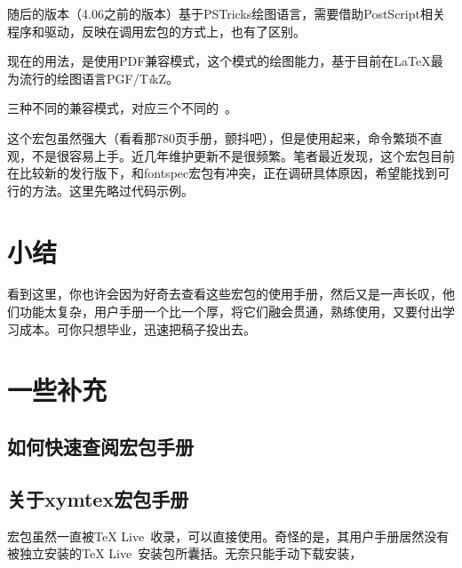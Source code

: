 \documentclass[a4paper,UTF8,zihao = -4]{ctexart} %
\providecommand{\tikzlg}{PGF/T\textit{i}kZ}
\begin{document}
随后的版本（4.06之前的版本）基于PSTricks绘图语言，需要借助PostScript相关程序和驱动，反映在调用宏包的方式上，也有了区别。

\begin{dispListing}
\usepackage{xymtexps} %
\end{dispListing}

现在的用法，是使用PDF兼容模式，这个模式的绘图能力，基于目前在\LaTeX{}最为流行的绘图语言\tikzlg{}。

\begin{dispListing}
\end{dispListing}

三种不同的兼容模式，对应三个不同的~。

这个宏包虽然强大（看看那780页手册，颤抖吧），但是使用起来，命令繁琐不直观，不是很容易上手。近几年维护更新不是很频繁。笔者最近发现，这个宏包目前在比较新的发行版下，和\textsf{fontspec}宏包有冲突，正在调研具体原因，希望能找到可行的方法。这里先略过代码示例。


\section*{小结}
\label{sec:conclusion}

看到这里，你也许会因为好奇去查看这些宏包的使用手册，然后又是一声长叹，他们功能太复杂，用户手册一个比一个厚，将它们融会贯通，熟练使用，又要付出学习成本。可你只想毕业，迅速把稿子投出去。

\section*{一些补充}
\label{sec:miscellaneous}


\subsection*{如何快速查阅宏包手册}
\label{sec:texdoc}



\subsection*{关于\textsf{xymtex}宏包手册} %
\label{sec:xymtexDoc}
\XyMTeX{}宏包虽然一直被\TeX{} Live~收录，可以直接使用。奇怪的是，其用户手册居然没有被独立安装的\TeX{} Live~安装包所囊括。无奈只能手动下载安装，
\end{document}
